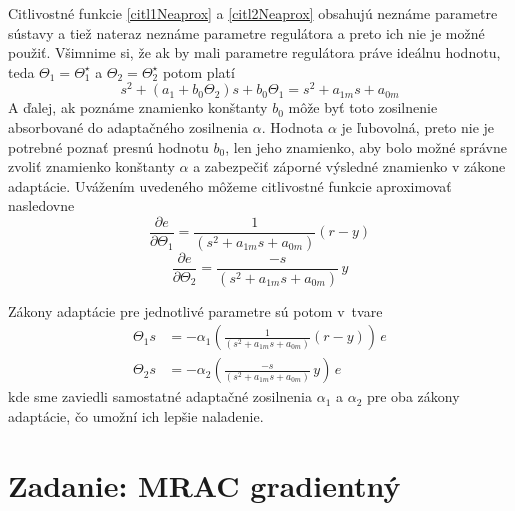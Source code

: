 \documentclass[a4paper, 10pt, ]{article}
\begin{document}
Citlivostné funkcie \eqref{citl1Neaprox} a \eqref{citl2Neaprox} obsahujú neznáme parametre sústavy a tiež nateraz neznáme parametre regulátora a preto ich nie je možné použiť. Všimnime si, že ak by mali parametre regulátora práve ideálnu hodnotu, teda ${\Theta}_1 = {\Theta}_1^\star$ a ${\Theta}_2 = {\Theta}_2^\star$ potom platí
\begin{equation}
	s^2 + \left( a_1 + b_0 \Theta_2 \right) s + b_0 \Theta_1 = s^2 + a_{1m} s + a_{0m}
\end{equation}
A ďalej, ak poznáme znamienko konštanty $b_0$ môže byť toto zosilnenie absorbované do adaptačného zosilnenia $\alpha$. Hodnota $\alpha$ je ľubovolná, preto nie je potrebné poznať presnú hodnotu $b_0$, len jeho znamienko, aby bolo možné správne zvoliť znamienko konštanty $\alpha$ a zabezpečiť záporné výsledné znamienko v zákone adaptácie.  Uvážením uvedeného môžeme citlivostné funkcie aproximovať nasledovne
\begin{equation} \label{citl1Aprox}
	\frac{\partial e}{\partial \Theta_1} = \frac{1}{ \left( s^2 + a_{1m} s + a_{0m} \right) } \left( r - y \right)
\end{equation}
\begin{equation} \label{citl2Aprox}
	\frac{\partial e}{\partial \Theta_2} = \frac{-s} { \left( s^2 + a_{1m} s + a_{0m} \right) } \,	y
\end{equation}

Zákony adaptácie pre jednotlivé parametre sú potom v~tvare
\begin{align}
	\Theta_1 s &= - \alpha_1 \left( \frac{1}{ \left( s^2 + a_{1m} s + a_{0m} \right) } \left( r - y \right) \right) \, e \\
	\Theta_2 s &= - \alpha_2 \left( \frac{-s}{ \left( s^2 + a_{1m} s + a_{0m} \right)} \, y \right) \, e
\end{align}
kde sme zaviedli samostatné adaptačné zosilnenia $\alpha_1$ a $\alpha_2$ pre oba zákony adaptácie, čo umožní ich lepšie naladenie.








\section{Zadanie: MRAC gradientný}
\label{cvicpiate}
\end{document}
